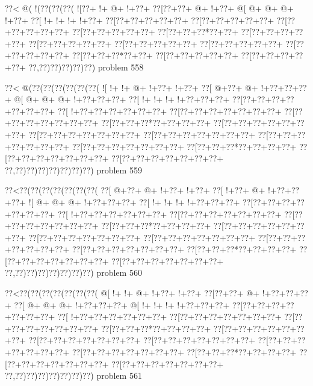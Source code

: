 \vbox{\vbox{\goo
\0??<\- @(\- !(\0??(\0??(\0??(
\- ![\0??+\- !+\- @+\- !+\0??+
\0??[\0??+\0??+\- @+\- !+\0??+
\- @[\- @+\- @+\- @+\- !+\0??+
\0??[\- !+\- !+\- !+\- !+\0??+
\0??[\0??+\0??+\0??+\0??+\0??+
\0??[\0??+\0??+\0??+\0??+\0??+
\0??[\0??+\0??+\0??+\0??+\0??+
\0??[\0??+\0??+\0??+\0??+\0??+
\0??[\0??+\0??+\0??*\0??+\0??+
\0??[\0??+\0??+\0??+\0??+\0??+
\0??[\0??+\0??+\0??+\0??+\0??+
\0??[\0??+\0??+\0??+\0??+\0??+
\0??[\0??+\0??+\0??+\0??+\0??+
\0??[\0??+\0??+\0??+\0??+\0??+
\0??[\0??+\0??+\0??*\0??+\0??+
\0??[\0??+\0??+\0??+\0??+\0??+
\0??[\0??+\0??+\0??+\0??+\0??+
\0??,\0??)\0??)\0??)\0??)\0??)
}
\hfil problem 558\hfil\break
}

\vbox{\vbox{\goo
\0??<\- @(\0??(\0??(\0??(\0??(\0??(\0??(
\- ![\- !+\- !+\- @+\- !+\0??+\- !+\0??+
\0??[\- @+\0??+\- @+\- !+\0??+\0??+\0??+
\- @[\- @+\- @+\- @+\- !+\0??+\0??+\0??+
\0??[\- !+\- !+\- !+\- !+\0??+\0??+\0??+
\0??[\0??+\0??+\0??+\0??+\0??+\0??+\0??+
\0??[\- !+\0??+\0??+\0??+\0??+\0??+\0??+
\0??[\0??+\0??+\0??+\0??+\0??+\0??+\0??+
\0??[\0??+\0??+\0??+\0??+\0??+\0??+\0??+
\0??[\0??+\0??+\0??*\0??+\0??+\0??+\0??+
\0??[\0??+\0??+\0??+\0??+\0??+\0??+\0??+
\0??[\0??+\0??+\0??+\0??+\0??+\0??+\0??+
\0??[\0??+\0??+\0??+\0??+\0??+\0??+\0??+
\0??[\0??+\0??+\0??+\0??+\0??+\0??+\0??+
\0??[\0??+\0??+\0??+\0??+\0??+\0??+\0??+
\0??[\0??+\0??+\0??*\0??+\0??+\0??+\0??+
\0??[\0??+\0??+\0??+\0??+\0??+\0??+\0??+
\0??[\0??+\0??+\0??+\0??+\0??+\0??+\0??+
\0??,\0??)\0??)\0??)\0??)\0??)\0??)\0??)
}
\hfil problem 559\hfil\break
}

\vbox{\vbox{\goo
\0??<\0??(\0??(\0??(\0??(\0??(\0??(\0??(
\0??[\- @+\0??+\- @+\- !+\0??+\- !+\0??+
\0??[\- !+\0??+\- @+\- !+\0??+\0??+\0??+
\- ![\- @+\- @+\- @+\- !+\0??+\0??+\0??+
\0??[\- !+\- !+\- !+\- !+\0??+\0??+\0??+
\0??[\0??+\0??+\0??+\0??+\0??+\0??+\0??+
\0??[\- !+\0??+\0??+\0??+\0??+\0??+\0??+
\0??[\0??+\0??+\0??+\0??+\0??+\0??+\0??+
\0??[\0??+\0??+\0??+\0??+\0??+\0??+\0??+
\0??[\0??+\0??+\0??*\0??+\0??+\0??+\0??+
\0??[\0??+\0??+\0??+\0??+\0??+\0??+\0??+
\0??[\0??+\0??+\0??+\0??+\0??+\0??+\0??+
\0??[\0??+\0??+\0??+\0??+\0??+\0??+\0??+
\0??[\0??+\0??+\0??+\0??+\0??+\0??+\0??+
\0??[\0??+\0??+\0??+\0??+\0??+\0??+\0??+
\0??[\0??+\0??+\0??*\0??+\0??+\0??+\0??+
\0??[\0??+\0??+\0??+\0??+\0??+\0??+\0??+
\0??[\0??+\0??+\0??+\0??+\0??+\0??+\0??+
\0??,\0??)\0??)\0??)\0??)\0??)\0??)\0??)
}
\hfil problem 560\hfil\break
}

\vbox{\vbox{\goo
\0??<\0??(\0??(\0??(\0??(\0??(\0??(\0??(
\- @[\- !+\- !+\- @+\- !+\0??+\- !+\0??+
\0??[\0??+\0??+\- @+\- !+\0??+\0??+\0??+
\0??[\- @+\- @+\- @+\- !+\0??+\0??+\0??+
\- @[\- !+\- !+\- !+\- !+\0??+\0??+\0??+
\0??[\0??+\0??+\0??+\0??+\0??+\0??+\0??+
\0??[\- !+\0??+\0??+\0??+\0??+\0??+\0??+
\0??[\0??+\0??+\0??+\0??+\0??+\0??+\0??+
\0??[\0??+\0??+\0??+\0??+\0??+\0??+\0??+
\0??[\0??+\0??+\0??*\0??+\0??+\0??+\0??+
\0??[\0??+\0??+\0??+\0??+\0??+\0??+\0??+
\0??[\0??+\0??+\0??+\0??+\0??+\0??+\0??+
\0??[\0??+\0??+\0??+\0??+\0??+\0??+\0??+
\0??[\0??+\0??+\0??+\0??+\0??+\0??+\0??+
\0??[\0??+\0??+\0??+\0??+\0??+\0??+\0??+
\0??[\0??+\0??+\0??*\0??+\0??+\0??+\0??+
\0??[\0??+\0??+\0??+\0??+\0??+\0??+\0??+
\0??[\0??+\0??+\0??+\0??+\0??+\0??+\0??+
\0??,\0??)\0??)\0??)\0??)\0??)\0??)\0??)
}
\hfil problem 561\hfil\break
}

